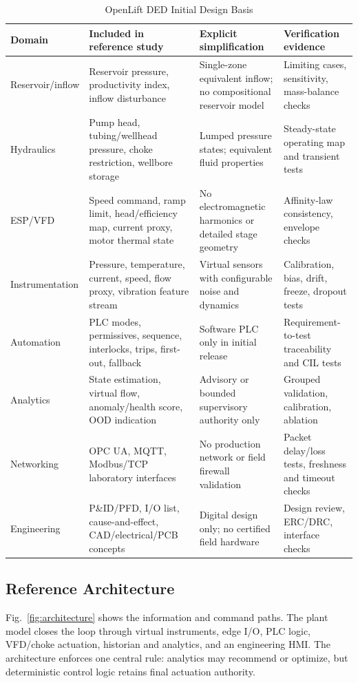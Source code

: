 \documentclass[conference]{IEEEtran}
\begin{document}
\begin{table}[t]
\caption{OpenLift DED Initial Design Basis}
\label{tab:basis}
\centering
\footnotesize
\begin{tabularx}{\textwidth}{p{}Y Y p{0.18\textwidth}}
\toprule
Domain & Included in reference study & Explicit simplification & Verification evidence \\
\midrule
Reservoir/inflow & Reservoir pressure, productivity index, inflow disturbance & Single-zone equivalent inflow; no compositional reservoir model & Limiting cases, sensitivity, mass-balance checks \\
Hydraulics & Pump head, tubing/wellhead pressure, choke restriction, wellbore storage & Lumped pressure states; equivalent fluid properties & Steady-state operating map and transient tests \\
ESP/VFD & Speed command, ramp limit, head/efficiency map, current proxy, motor thermal state & No electromagnetic harmonics or detailed stage geometry & Affinity-law consistency, envelope checks \\
Instrumentation & Pressure, temperature, current, speed, flow proxy, vibration feature stream & Virtual sensors with configurable noise and dynamics & Calibration, bias, drift, freeze, dropout tests \\
Automation & PLC modes, permissives, sequence, interlocks, trips, first-out, fallback & Software PLC only in initial release & Requirement-to-test traceability and CIL tests \\
Analytics & State estimation, virtual flow, anomaly/health score, OOD indication & Advisory or bounded supervisory authority only & Grouped validation, calibration, ablation \\
Networking & OPC UA, MQTT, Modbus/TCP laboratory interfaces & No production network or field firewall validation & Packet delay/loss tests, freshness and timeout checks \\
Engineering & P\&ID/PFD, I/O list, cause-and-effect, CAD/electrical/PCB concepts & Digital design only; no certified field hardware & Design review, ERC/DRC, interface checks \\
\bottomrule
\end{tabularx}
\end{table}

\subsection{Reference Architecture}
Fig.~\ref{fig:architecture} shows the information and command paths. The plant model closes the loop through virtual instruments, edge I/O, PLC logic, VFD/choke actuation, historian and analytics, and an engineering HMI. The architecture enforces one central rule: analytics may recommend or optimize, but deterministic control logic retains final actuation authority.
\end{document}
